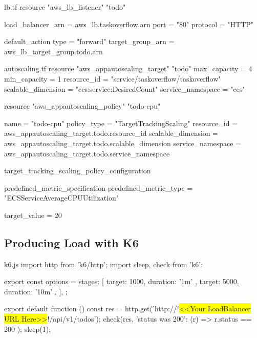 \documentclass{csse4400}
\begin{document}
\begin{code}[language=terraform,numbers=none]{lb.tf}
resource "aws_lb_listener" "todo" {
  load_balancer_arn = aws_lb.taskoverflow.arn
  port              = "80"
  protocol          = "HTTP"

  default_action {
    type             = "forward"
    target_group_arn = aws_lb_target_group.todo.arn
  }
}
\end{code}


\begin{code}[language=terraform,numbers=none]{autoscaling.tf}
resource "aws_appautoscaling_target" "todo" {
  max_capacity = 4
  min_capacity = 1
  resource_id = "service/taskoverflow/taskoverflow"
  scalable_dimension = "ecs:service:DesiredCount"
  service_namespace = "ecs"
}


resource "aws_appautoscaling_policy" "todo-cpu" {
  name = "todo-cpu"
  policy_type = "TargetTrackingScaling"
  resource_id = aws_appautoscaling_target.todo.resource_id
  scalable_dimension = aws_appautoscaling_target.todo.scalable_dimension
  service_namespace = aws_appautoscaling_target.todo.service_namespace

  target_tracking_scaling_policy_configuration {
    predefined_metric_specification {
      predefined_metric_type = "ECSServiceAverageCPUUtilization"
    }

    target_value = 20
  }
}
\end{code}

\subsection{Producing Load with K6}

\begin{code}[language=javascript,numbers=none,escapechar=!]{k6.js}
import http from 'k6/http';
import { sleep, check } from 'k6';

export const options = {
  stages: [
    { target: 1000, duration: '1m' },
    { target: 5000, duration: '10m' },
  ],
};

export default function () {
  const res = http.get('http://!\colorbox{yellow}{<<Your LoadBalancer URL Here>>}!/api/v1/todos');
  check(res, { 'status was 200': (r) => r.status == 200 });
  sleep(1);
}
\end{code}




\end{document}
